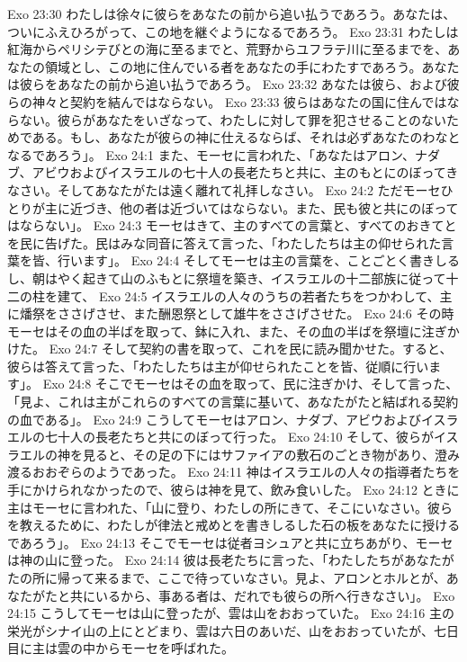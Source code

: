 Exo 23:30  わたしは徐々に彼らをあなたの前から追い払うであろう。あなたは、ついにふえひろがって、この地を継ぐようになるであろう。
Exo 23:31  わたしは紅海からペリシテびとの海に至るまでと、荒野からユフラテ川に至るまでを、あなたの領域とし、この地に住んでいる者をあなたの手にわたすであろう。あなたは彼らをあなたの前から追い払うであろう。
Exo 23:32  あなたは彼ら、および彼らの神々と契約を結んではならない。
Exo 23:33  彼らはあなたの国に住んではならない。彼らがあなたをいざなって、わたしに対して罪を犯させることのないためである。もし、あなたが彼らの神に仕えるならば、それは必ずあなたのわなとなるであろう」。
Exo 24:1  また、モーセに言われた、「あなたはアロン、ナダブ、アビウおよびイスラエルの七十人の長老たちと共に、主のもとにのぼってきなさい。そしてあなたがたは遠く離れて礼拝しなさい。
Exo 24:2  ただモーセひとりが主に近づき、他の者は近づいてはならない。また、民も彼と共にのぼってはならない」。
Exo 24:3  モーセはきて、主のすべての言葉と、すべてのおきてとを民に告げた。民はみな同音に答えて言った、「わたしたちは主の仰せられた言葉を皆、行います」。
Exo 24:4  そしてモーセは主の言葉を、ことごとく書きしるし、朝はやく起きて山のふもとに祭壇を築き、イスラエルの十二部族に従って十二の柱を建て、
Exo 24:5  イスラエルの人々のうちの若者たちをつかわして、主に燔祭をささげさせ、また酬恩祭として雄牛をささげさせた。
Exo 24:6  その時モーセはその血の半ばを取って、鉢に入れ、また、その血の半ばを祭壇に注ぎかけた。
Exo 24:7  そして契約の書を取って、これを民に読み聞かせた。すると、彼らは答えて言った、「わたしたちは主が仰せられたことを皆、従順に行います」。
Exo 24:8  そこでモーセはその血を取って、民に注ぎかけ、そして言った、「見よ、これは主がこれらのすべての言葉に基いて、あなたがたと結ばれる契約の血である」。
Exo 24:9  こうしてモーセはアロン、ナダブ、アビウおよびイスラエルの七十人の長老たちと共にのぼって行った。
Exo 24:10  そして、彼らがイスラエルの神を見ると、その足の下にはサファイアの敷石のごとき物があり、澄み渡るおおぞらのようであった。
Exo 24:11  神はイスラエルの人々の指導者たちを手にかけられなかったので、彼らは神を見て、飲み食いした。
Exo 24:12  ときに主はモーセに言われた、「山に登り、わたしの所にきて、そこにいなさい。彼らを教えるために、わたしが律法と戒めとを書きしるした石の板をあなたに授けるであろう」。
Exo 24:13  そこでモーセは従者ヨシュアと共に立ちあがり、モーセは神の山に登った。
Exo 24:14  彼は長老たちに言った、「わたしたちがあなたがたの所に帰って来るまで、ここで待っていなさい。見よ、アロンとホルとが、あなたがたと共にいるから、事ある者は、だれでも彼らの所へ行きなさい」。
Exo 24:15  こうしてモーセは山に登ったが、雲は山をおおっていた。
Exo 24:16  主の栄光がシナイ山の上にとどまり、雲は六日のあいだ、山をおおっていたが、七日目に主は雲の中からモーセを呼ばれた。
